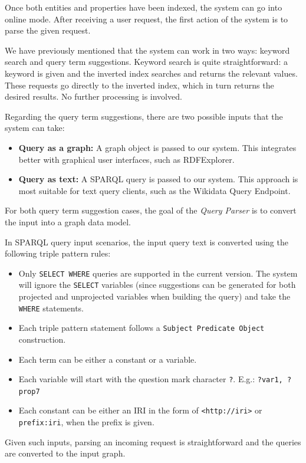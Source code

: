 Once both entities and properties have been indexed, the system can go into online mode. After receiving a user request, the first action of the system is to parse the given request.

We have previously mentioned that the system can work in two ways: keyword search and query term suggestions. Keyword search is quite straightforward: a keyword is given and the inverted index searches and returns the relevant values. These requests go directly to the inverted index, which in turn returns the desired results. No further processing is involved.

Regarding the query term suggestions, there are two possible inputs that the system can take:
\begin{itemize}
    \item \textbf{Query as a graph:} A graph object is passed to our system. This integrates better with graphical user interfaces, such as RDFExplorer.
    \item \textbf{Query as text:} A SPARQL query is passed to our system. This approach is most suitable for text query clients, such as the Wikidata Query Endpoint.
\end{itemize}

For both query term suggestion cases, the goal of the \textit{Query Parser} is to convert the input into a graph data model.

In SPARQL query input scenarios, the input query text is converted using the following triple pattern rules:
\begin{itemize}
    \item Only \texttt{SELECT WHERE} queries are supported in the current version. The system will ignore the \texttt{SELECT} variables (since suggestions can be generated for both projected and unprojected variables when building the query) and take the \texttt{WHERE} statements.
    \item Each triple pattern statement follows a \texttt{Subject Predicate Object} construction.
    \item Each term can be either a constant or a variable.
    \item Each variable will start with the question mark character \texttt{?}. E.g.: \texttt{?var1, ?prop7}
    \item Each constant can be either an IRI in the form of \texttt{<http://iri>} or \texttt{prefix:iri}, when the prefix is given.
\end{itemize}

Given such inputs, parsing an incoming request is straightforward and the queries are converted to the input graph.

